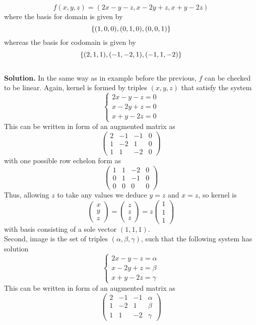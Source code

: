 \documentclass[12pt,fleqn]{article} %
\begin{document}
\begin{enumerate}
	\[f(x,y,z)=(2x-y-z,x-2y+z,x+y-2z)\]
	where the basis for domain is given by
	\[\left\{(1,0,0),(0,1,0),(0,0,1)\right\}\]
	whereas the basis for codomain is given by
	\[\left\{(2,1,1),(-1,-2,1),(-1,1,-2)\right\}\]
	\\\textbf{Solution.} 
	In the same way as in example before the previous, $f$ can be checked to be linear. Again, kernel is formed by triples
	$(x,y,z)$ that satisfy the system
	\[\begin{cases}2x-y-z=0\\x-2y+z=0\\x+y-2z=0\end{cases}\]
	This can be written in form of an augmented matrix as
	\[\left(\begin{array}{rrr|r}2&-1&-1&0\\1&-2&1&0\\1&1&-2&0\end{array}\right)\]
	with one possible row echelon form as
	\[\left(\begin{array}{rrr|r}1&1&-2&0\\0&1&-1&0\\0&0&0&0\end{array}\right)\]
	Thus, allowing $z$ to take any values we deduce $y=z$ and $x=z$, so kernel is
	\[\begin{pmatrix}x\\y\\z\end{pmatrix}=\begin{pmatrix}z\\z\\z\end{pmatrix}=z\begin{pmatrix}1\\1\\1\end{pmatrix}\]
	with basis consisting of a sole vector $(1,1,1)$. \\
	Second, image is the set of triples $(\alpha,\beta,\gamma)$, such that the following system has solution
	\[\begin{cases}2x-y-z=\alpha\\x-2y+z=\beta\\x+y-2z=\gamma\end{cases}\]
	This can be written in form of an augmented matrix as
	\[\left(\begin{array}{rrr|r}2&-1&-1&\alpha\\1&-2&1&\beta\\1&1&-2&\gamma\end{array}\right)\]

\end{enumerate}
\end{document}
